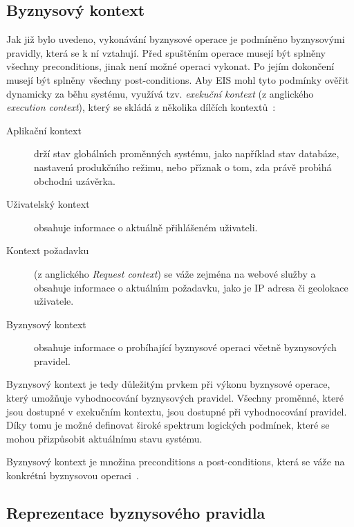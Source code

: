 \subsection{Byznysov\'y kontext}

Jak již bylo uvedeno, vykonávání byznysové operace je podmíněno byznysovými pravidly, která se k ní vztahují. Před spuštěním operace musejí
být splněny všechny preconditions, jinak není možné operaci vykonat. Po jejím dokončení musejí být splněny všechny post-conditions.
Aby \gls{EIS} mohl tyto podmínky ověřit dynamicky za běhu systému, využívá tzv. \textit{exekuční kontext} (z anglického
\textit{execution context}), který se skládá z několika dílčích kontextů~\cite{cemus2017separation}:

\begin{description}
    \item[Aplikační kontext] drží stav globáln\'{\i}ch proměnn\'ych systému, jako například stav databáze,
    nastaven\'{\i} produkčn\'{\i}ho režimu, nebo př\'{\i}znak o tom, zda právě prob\'{\i}há obchodn\'{\i} uzávěrka.
    \item[Uživatelský kontext] obsahuje informace o aktuálně přihlášeném uživateli.
    \item[Kontext požadavku] (z anglického \textit{Request context}) se váže zejména na webové služby a obsahuje
    informace o aktuáln\'{\i}m požadavku, jako je IP adresa či geolokace uživatele.
    \item[Byznysov\'y kontext] obsahuje informace o probíhající byznysové operaci včetně byznysových pravidel.
\end{description}

Byznysový kontext je tedy důležitým prvkem při výkonu byznysové operace, který umožňuje vyhodnocování byznysových pravidel.
Všechny proměnné, které jsou dostupné v exekučním kontextu, jsou dostupné při vyhodnocování pravidel. Díky tomu je možné
definovat široké spektrum logických podmínek, které se mohou přizpůsobit aktuálnímu stavu systému.

\begin{definition}
    Byznysový kontext je množina preconditions a post-conditions, která se váže na konkrétn\'{\i} byznysovou
    operaci~\cite{cemus2015automated}.
\end{definition}

\subsection{Reprezentace byznysového pravidla}\label{sec:business-rule-representation}

